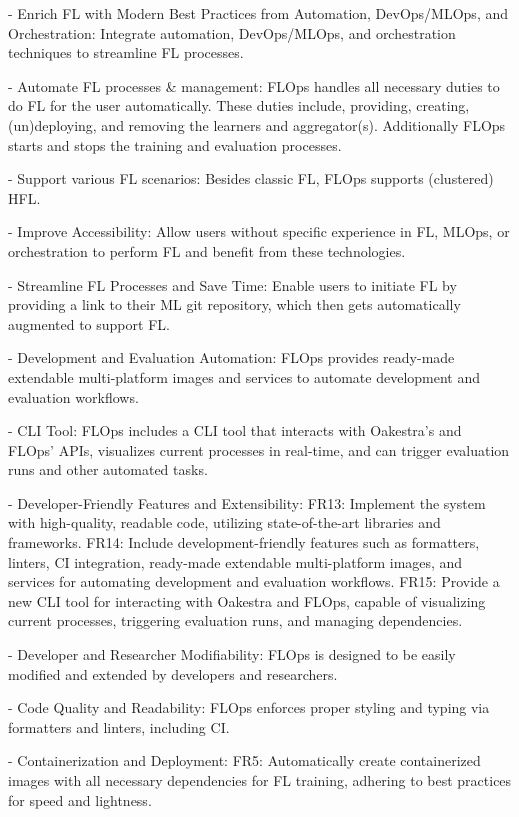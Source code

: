 - Enrich FL with Modern Best Practices from Automation, DevOps/MLOps, and Orchestration:
    Integrate automation, DevOps/MLOps, and orchestration techniques to streamline FL processes.

- Automate FL processes & management:
    FLOps handles all necessary duties to do FL for the user automatically.
    These duties include, providing, creating, (un)deploying, and removing the learners and aggregator(s).
    Additionally FLOps starts and stops the training and evaluation processes.

- Support various FL scenarios:
    Besides classic FL, FLOps supports (clustered) HFL.    


- Improve Accessibility:
    Allow users without specific experience in FL, MLOps, or orchestration to perform FL and benefit from these technologies.

- Streamline FL Processes and Save Time:
    Enable users to initiate FL by providing a link to their ML git repository, which then gets automatically augmented to support FL.

- Development and Evaluation Automation:
    FLOps provides ready-made extendable multi-platform images and services to automate development and evaluation workflows.

- CLI Tool:
    FLOps includes a CLI tool that interacts with Oakestra’s and FLOps’ APIs, visualizes current processes in real-time, and can trigger evaluation runs and other automated tasks.

- Developer-Friendly Features and Extensibility:
    FR13: Implement the system with high-quality, readable code, utilizing state-of-the-art libraries and frameworks.
    FR14: Include development-friendly features such as formatters, linters, CI integration, ready-made extendable multi-platform images, and services for automating development and evaluation workflows.
    FR15: Provide a new CLI tool for interacting with Oakestra and FLOps, capable of visualizing current processes, triggering evaluation runs, and managing dependencies.

- Developer and Researcher Modifiability:
    FLOps is designed to be easily modified and extended by developers and researchers.

- Code Quality and Readability:
    FLOps enforces proper styling and typing via formatters and linters, including CI.    


- Containerization and Deployment:
    FR5: Automatically create containerized images with all necessary dependencies for FL training, adhering to best practices for speed and lightness.

